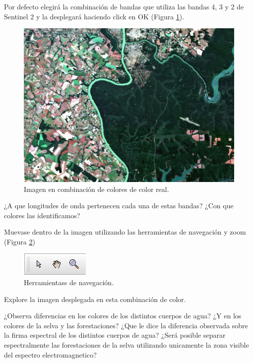\documentclass[a4paper,10pt]{book}
\begin{document}
Por defecto elegirá la combinación de bandas que utiliza las bandas 4, 3 y 2 de Sentinel 2 y la desplegará haciendo click en OK (Figura \ref{fig:RVA}).

\begin{figure}[h!]
    \centering
    \includegraphics[scale=0.5]{fig:RVA.png}
    \caption{Imagen en combinación de colores de color real.}
    \label{fig:RVA}
\end{figure}

\begin{que}
    ¿A que longitudes de onda pertenecen cada una de estas bandas? ¿Con que colores las identificamos?
\end{que}

Muevase dentro de la imagen utilizando las herramientas de navegación y zoom (Figura \ref{fig:NAV})

\begin{figure}[h!]
    \centering
    \includegraphics[scale=0.5]{fig:NAV.png}
    \caption{Herramientass de navegación.}
    \label{fig:NAV}
\end{figure}

Explore la imagen desplegada en esta combinación de color.

\begin{que}
    ¿Observa diferencias en los colores de los distintos cuerpos de agua? ¿Y en los colores de la selva y las forestaciones? ¿Que le dice la diferencia observada sobre la firma espectral de los distintos cuerpos de agua? ¿Será posible separar espectralmente las forestaciones de la selva utilizando unicamente la zona visible del espectro electromagnetico?
\end{que}
\end{document}
